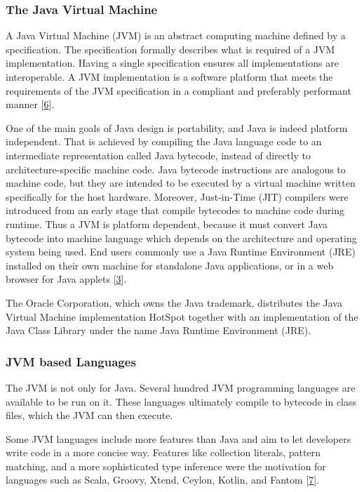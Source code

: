 \documentclass[12pt,a4paper,oneside,openright]{book}
\begin{document}
\subsubsection{The Java Virtual Machine}\label{the-java-virtual-machine}

A Java Virtual Machine (JVM) is an abstract computing machine defined by
a specification. The specification formally describes what is required
of a JVM implementation. Having a single specification ensures all
implementations are interoperable. A JVM implementation is a software
platform that meets the requirements of the JVM specification in a
compliant and preferably performant manner
{[}\hyperref[ref-JVMWiki2015]{6}{]}.

One of the main goals of Java design is portability, and Java is indeed
platform independent. That is achieved by compiling the Java language
code to an intermediate representation called Java bytecode, instead of
directly to architecture-specific machine code. Java bytecode
instructions are analogous to machine code, but they are intended to be
executed by a virtual machine written specifically for the host
hardware. Moreover, Just-in-Time (JIT) compilers were introduced from an
early stage that compile bytecodes to machine code during runtime. Thus
a JVM is platform dependent, because it must convert Java bytecode into
machine language which depends on the architecture and operating system
being used. End users commonly use a Java Runtime Environment (JRE)
installed on their own machine for standalone Java applications, or in a
web browser for Java applets {[}\hyperref[ref-JavaWiki2015]{3}{]}.

The Oracle Corporation, which owns the Java trademark, distributes the
Java Virtual Machine implementation HotSpot together with an
implementation of the Java Class Library under the name Java Runtime
Environment (JRE).

\subsubsection{JVM based Languages}\label{jvm-based-languages}

The JVM is not only for Java. Several hundred JVM programming languages
are available to be run on it. These languages ultimately compile to
bytecode in class files, which the JVM can then execute.

Some JVM languages include more features than Java and aim to let
developers write code in a more concise way. Features like collection
literals, pattern matching, and a more sophisticated type inference were
the motivation for languages such as Scala, Groovy, Xtend, Ceylon,
Kotlin, and Fantom {[}\hyperref[ref-JVMLang2015]{7}{]}.
\end{document}
